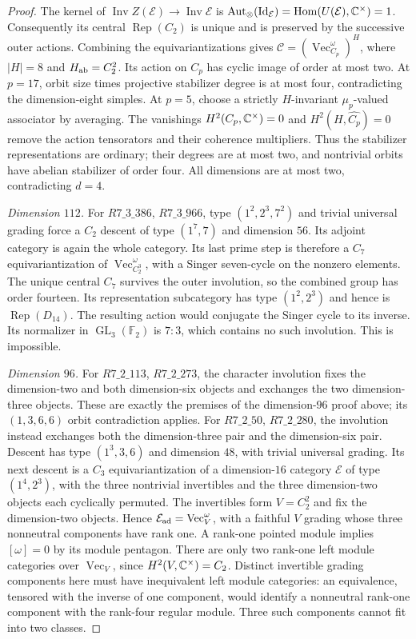 \begin{proof}
The kernel of
$\operatorname{Inv}Z(\mathcal E)\to\operatorname{Inv}\mathcal E$ is
$\operatorname{Aut}_{\otimes}(\operatorname{Id}_{\mathcal E})
=\operatorname{Hom}(U(\mathcal E),\mathbb C^\times)=1$.
Consequently its central $\operatorname{Rep}(C_2)$ is unique and is
preserved by the successive outer actions. Combining the
 equivariantizations \cite{DGNO,ENOSolvable} gives
$\mathcal C=(\operatorname{Vec}_{C_p}^{\omega})^H$, where $|H|=8$ and
$H_{\rm ab}=C_2^2$. Its action on $C_p$ has cyclic image of order at
most two. At $p=17$, orbit size times projective stabilizer degree is
at most four, contradicting the dimension-eight simples.
At $p=5$, choose a strictly $H$-invariant $\mu_p$-valued associator by
averaging. The vanishings $H^2(C_p,\mathbb C^\times)=0$ and
$H^2(H,\widehat{C_p})=0$ remove the action tensorators and their
coherence multipliers. Thus the stabilizer representations are ordinary;
their degrees are at most two, and nontrivial orbits have abelian
stabilizer of order four. All dimensions are at most two, contradicting
$d=4$.

\emph{Dimension $112$.}
For $R7\_3\_386$, $R7\_3\_966$, type $(1^2,2^3,7^2)$ and trivial
universal grading force a $C_2$ descent of type $(1^7,7)$ and dimension
$56$. Its adjoint category is again the whole category. Its last prime
step is therefore a $C_7$ equivariantization of
$\operatorname{Vec}_{C_2^3}^{\omega}$, with a Singer seven-cycle on
the nonzero elements. The unique central $C_7$ survives the outer
involution, so the combined group has order fourteen. Its representation
subcategory has type $(1^2,2^3)$ and hence is $\operatorname{Rep}(D_{14})$.
The resulting action would conjugate the Singer cycle to its inverse.
Its normalizer in $\operatorname{GL}_3(\mathbb F_2)$ is $7{:}3$, which
contains no such involution. This is impossible.

\emph{Dimension $96$.}
For $R7\_2\_113$, $R7\_2\_273$, the character involution fixes the
dimension-two and both dimension-six objects and exchanges the two
dimension-three objects. These are exactly the premises of the
dimension-$96$ proof above; its $(1,3,6,6)$ orbit contradiction applies.
For $R7\_2\_50$, $R7\_2\_280$, the involution instead exchanges both
the dimension-three pair and the dimension-six pair. Descent has type
$(1^3,3,6)$ and dimension $48$, with trivial universal grading. Its
next descent is a $C_3$ equivariantization of a dimension-$16$ category
$\mathcal E$ of type $(1^4,2^3)$, with the three nontrivial invertibles
and the three dimension-two objects each cyclically permuted.
The invertibles form $V=C_2^2$ and fix the dimension-two objects.
Hence $\mathcal E_{\rm ad}=\operatorname{Vec}_V^{\omega}$, with a
faithful $V$ grading whose three nonneutral components have rank one.
A rank-one pointed module implies $[\omega]=0$ by its module pentagon.
There are only two rank-one left module categories over
$\operatorname{Vec}_V$, since $H^2(V,\mathbb C^\times)=C_2$.
Distinct invertible grading components here must have inequivalent left
module categories: an equivalence, tensored with the inverse of one
component, would identify a nonneutral rank-one component with the
rank-four regular module. Three such components cannot fit into two
classes.


\end{proof}
